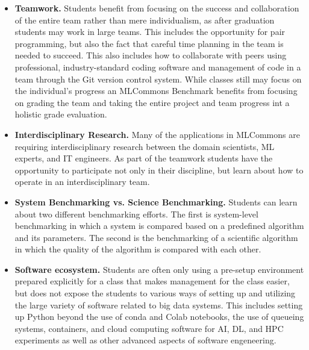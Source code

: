 \documentclass[utf8]{FrontiersinVancouver} %
\begin{document}
\begin{itemize}


\item {\bf Teamwork.} Students benefit from focusing on the success
  and collaboration of the entire team rather than mere individualism,
  as after graduation students may work in large teams. This includes
  the opportunity for pair programming, but also the fact that careful
  time planning in the team is needed to succeed.  This also includes
  how to collaborate with peers using professional, industry-standard
  coding software and management of code in a team through the Git
  version control system. While classes still may focus on the
  individual's progress an MLCommons Benchmark benefits from focusing
  on grading the team and taking the entire project and team progress
  int a holistic grade evaluation.

  \item {\bf Interdisciplinary Research.} Many of the applications in
    MLCommons are requiring interdisciplinary research between the domain
    scientists, ML experts, and IT engineers. As part of the teamwork
    students have the opportunity to participate not only in their
    discipline, but learn about how to operate in an interdisciplinary
    team.

  \item {\bf System Benchmarking vs. Science Benchmarking.} Students
    can learn about two different benchmarking efforts. The first is
    system-level benchmarking in which a system is compared based
    on a predefined algorithm and its parameters. The second is the
    benchmarking of a scientific algorithm in which the quality of the
    algorithm is compared with each other.

  \item {\bf Software ecosystem.} Students are often only using a
    pre-setup environment prepared explicitly for a class that makes
    management for the class easier, but does not expose the students
    to various ways of setting up and utilizing the large variety of
    software related to big data systems. This includes setting up
    Python beyond the use of conda and Colab notebooks, the use of
    queueing systems, containers, and cloud computing software for
    AI, DL, and HPC experiments as well as other advanced aspects of
    software engeneering.


\end{itemize}
\end{document}
